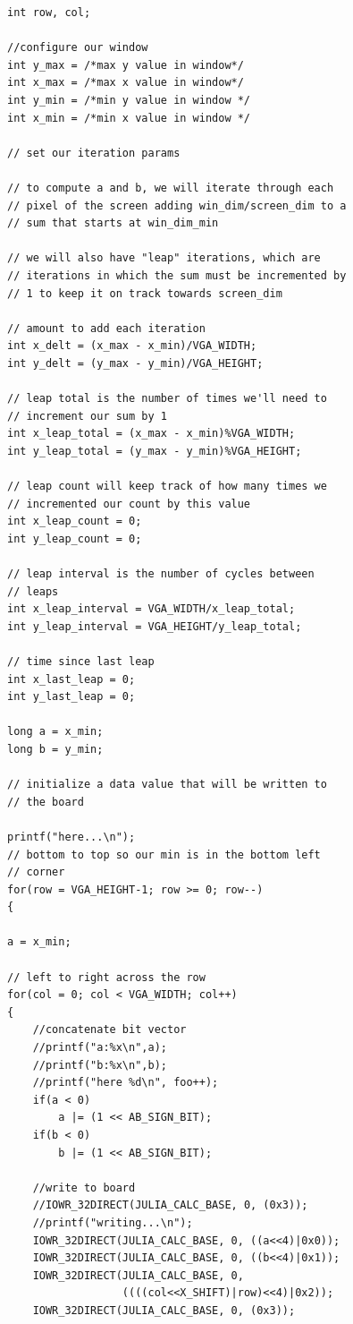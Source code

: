 \documentclass{article}
\begin{document}
\begin{lstlisting}[caption="Window Generation Procedure"]
int row, col;
   
//configure our window
int y_max = /*max y value in window*/
int x_max = /*max x value in window*/
int y_min = /*min y value in window */
int x_min = /*min x value in window */

// set our iteration params

// to compute a and b, we will iterate through each
// pixel of the screen adding win_dim/screen_dim to a
// sum that starts at win_dim_min

// we will also have "leap" iterations, which are
// iterations in which the sum must be incremented by
// 1 to keep it on track towards screen_dim

// amount to add each iteration
int x_delt = (x_max - x_min)/VGA_WIDTH;
int y_delt = (y_max - y_min)/VGA_HEIGHT;

// leap total is the number of times we'll need to
// increment our sum by 1
int x_leap_total = (x_max - x_min)%VGA_WIDTH;
int y_leap_total = (y_max - y_min)%VGA_HEIGHT;

// leap count will keep track of how many times we
// incremented our count by this value
int x_leap_count = 0;
int y_leap_count = 0;

// leap interval is the number of cycles between
// leaps
int x_leap_interval = VGA_WIDTH/x_leap_total;
int y_leap_interval = VGA_HEIGHT/y_leap_total;

// time since last leap
int x_last_leap = 0;
int y_last_leap = 0;

long a = x_min;
long b = y_min;

// initialize a data value that will be written to
// the board

printf("here...\n");
// bottom to top so our min is in the bottom left
// corner
for(row = VGA_HEIGHT-1; row >= 0; row--)
{

a = x_min;

// left to right across the row
for(col = 0; col < VGA_WIDTH; col++)
{
    //concatenate bit vector
    //printf("a:%x\n",a);
    //printf("b:%x\n",b);
    //printf("here %d\n", foo++);
    if(a < 0)
        a |= (1 << AB_SIGN_BIT);
    if(b < 0)
        b |= (1 << AB_SIGN_BIT);
                   
    //write to board
    //IOWR_32DIRECT(JULIA_CALC_BASE, 0, (0x3));
    //printf("writing...\n");
    IOWR_32DIRECT(JULIA_CALC_BASE, 0, ((a<<4)|0x0));
    IOWR_32DIRECT(JULIA_CALC_BASE, 0, ((b<<4)|0x1));
    IOWR_32DIRECT(JULIA_CALC_BASE, 0,
                  ((((col<<X_SHIFT)|row)<<4)|0x2));
    IOWR_32DIRECT(JULIA_CALC_BASE, 0, (0x3));
   

\end{lstlisting}
\end{document}
